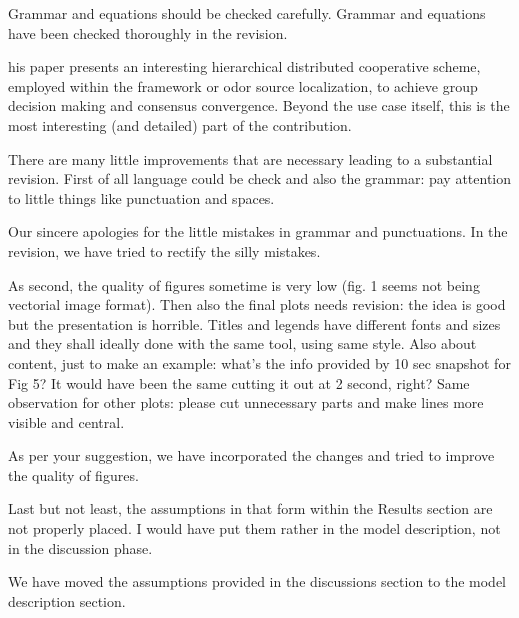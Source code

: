 \documentclass[10pt]{article}
\begin{document}
\begin{response}{Grammar and equations should be checked carefully.}
Grammar and equations have been checked thoroughly in the revision.

\end{response}

his paper presents an interesting hierarchical distributed cooperative scheme, employed within the framework or odor source localization, to achieve group decision making and consensus convergence. Beyond the use case itself, this is the most interesting (and detailed) part of the contribution.

\begin{response}{There are many little improvements that are necessary leading to a substantial revision. First of all language could be check and also the grammar: pay attention to little things like punctuation and spaces.}

Our sincere apologies for the little mistakes in grammar and punctuations. In the revision, we have tried to rectify the silly mistakes.

\end{response}

\begin{response}{As second, the quality of figures sometime is very low (fig. 1 seems not being vectorial image format). Then also the final plots needs revision: the idea is good but the presentation is horrible. Titles and legends have different fonts and sizes and they shall ideally done with the same tool, using same style. Also about content, just to make an example: what's the info provided by 10 sec snapshot for Fig 5? It would have been the same cutting it out at 2 second, right? Same observation for other plots: please cut unnecessary parts and make lines more visible and central.}

As per your suggestion, we have incorporated the changes and tried to improve the quality of figures.

\end{response}

\begin{response}{Last but not least, the assumptions in that form within the Results section are not properly placed. I would have put them rather in the model description, not in the discussion phase.}

We have moved the assumptions provided in the discussions section to the model description section.

\end{response}



\end{document}
